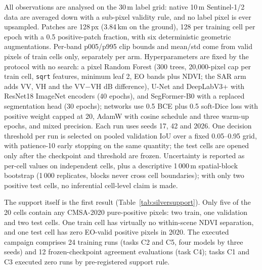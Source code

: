 All observations are analysed on the 30\,m label grid: native 10\,m
Sentinel-1/2 data are averaged down with a sub-pixel validity rule, and
no label pixel is ever upsampled. Patches are 128\,px (3.84\,km on the
ground), 128 per training cell per epoch with a 0.5 positive-patch
fraction, with six deterministic geometric augmentations. Per-band
p005/p995 clip bounds and mean/std come from valid pixels of train cells
only, separately per arm. Hyperparameters are fixed by the protocol
with no search: a pixel Random Forest (300 trees, 20{,}000-pixel cap per
train cell, \texttt{sqrt} features, minimum leaf 2, EO bands plus NDVI;
the SAR arm adds VV, VH and the VV$-$VH dB difference), U-Net and
DeepLabV3+ with ResNet18 ImageNet encoders (40 epochs), and
SegFormer-B0 with a replaced segmentation head (30 epochs); networks use
0.5 BCE plus 0.5 soft-Dice loss with positive weight capped at 20,
AdamW with cosine schedule and three warm-up epochs, and mixed
precision. Each run uses seeds 17, 42 and 2026. One decision threshold
per run is selected on pooled validation IoU over a fixed 0.05--0.95
grid, with patience-10 early stopping on the same quantity; the test
cells are opened only after the checkpoint and threshold are frozen.
Uncertainty is reported as per-cell values on independent cells, plus a
descriptive 1\,000\,m spatial-block bootstrap (1\,000 replicates, blocks
never cross cell boundaries); with only two positive test cells, no
inferential cell-level claim is made.

The support itself is the first result (Table~\ref{tab:silversupport}).
Only five of the 20 cells contain any CMSA-2020 pure-positive pixels:
two train, one validation and two test cells. One train cell has
virtually no within-scene NDVI separation, and one test cell has zero
EO-valid positive pixels in 2020. The executed campaign comprises 24
training runs (tasks C2 and C5, four models by three seeds) and 12
frozen-checkpoint agreement evaluations (task C4); tasks C1 and C3
executed zero runs by pre-registered support rule.



